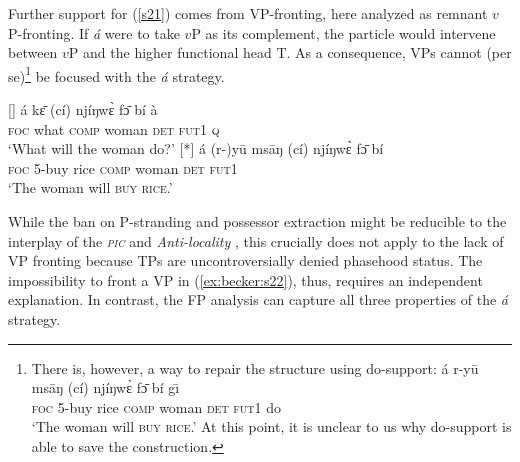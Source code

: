 \documentclass[output=paper,
modfonts
]{langscibook}
\begin{document}
Further support for (\ref{s21}) comes from VP-fronting, here analyzed as remnant $v$P-fronting. If {\em \'a} were to take $v$P as its complement, the particle would intervene between $v$P and the higher functional head T. As a consequence, VPs cannot (per se)\footnote{There is, however, a way to repair the structure using do-support:
\ea
\gll \'a {r-y\=u} {ms\=aŋ} (c\'i) nj\'iŋw\`ɛ f\=ɔ b\'i {g\={\i}} \\ \textsc{foc} {{5}-buy} {rice} \textsc{comp} woman \textsc{det} \textsc{fut1} {do} \\ 
\glt `The woman will \textsc{\MakeLowercase{BUY}} \textsc{\MakeLowercase{RICE}}.'
\z
At this point, it is unclear to us why do-support is able to save the construction. %
} be focused with the {\em \'a} strategy.
\begin{exe}
\ex \label{ex:becker:s22}
	\begin{xlist}
		[]{ 
			\gll \'a k\=ε{} (c\'i) nj\'iŋw\`ɛ f\=ɔ b\'i \`a \\ 
			\textsc{foc} what \textsc{comp} woman \textsc{det} \textsc{fut1} \textsc{q}\\ 
			\glt `What will the woman do?'}
		[*]{ 
			\gll \'a {(r-)y\=u} {ms\=aŋ} (c\'i) nj\'iŋw\`ɛ f\=ɔ b\'i \\ 
			\textsc{foc} 5-buy {rice} \textsc{comp} woman \textsc{det} \textsc{fut1}\\ 
			\glt `The woman will \textsc{\MakeLowercase{BUY}} \textsc{\MakeLowercase{RICE}}.'}
	\end{xlist}
\end{exe}
While the ban on P-stranding and possessor extraction might be reducible to the interplay of the {\em \textsc{\MakeLowercase{PIC}}} \citep{Chomsky2000} and {\em Anti-locality} \citep{Abels2003,Erlewine2016}, this crucially does not apply to the lack of VP fronting because TPs are uncontroversially denied phasehood status. The impossibility to front a VP in (\ref{ex:becker:s22}), thus, requires an independent explanation. In contrast, the FP analysis can capture all three properties of the {\em \'a} strategy.
\end{document}
